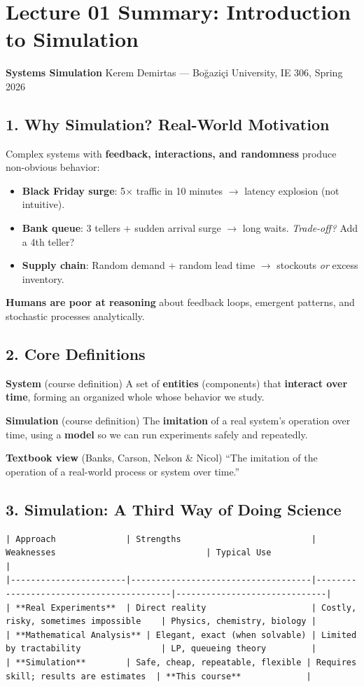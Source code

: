 \documentclass[11pt]{article}
\begin{document}
\section*{Lecture 01 Summary: Introduction to Simulation}
\textbf{Systems Simulation}
Kerem Demirtas --- Boğaziçi University, IE 306, Spring 2026

\subsection*{1. Why Simulation? Real-World Motivation}
Complex systems with \textbf{feedback, interactions, and randomness} produce non-obvious behavior:

\begin{itemize}[leftmargin=*]
\item \textbf{Black Friday surge}: 5$\times$ traffic in 10 minutes $\rightarrow$ latency explosion (not intuitive).
\item \textbf{Bank queue}: 3 tellers + sudden arrival surge $\rightarrow$ long waits. \textit{Trade-off?} Add a 4th teller?
\item \textbf{Supply chain}: Random demand + random lead time $\rightarrow$ stockouts \textit{or} excess inventory.
\end{itemize}

\textbf{Humans are poor at reasoning} about feedback loops, emergent patterns, and stochastic processes analytically.

\subsection*{2. Core Definitions}
\textbf{System} (course definition)  
A set of \textbf{entities} (components) that \textbf{interact over time}, forming an organized whole whose behavior we study.

\textbf{Simulation} (course definition)  
The \textbf{imitation} of a real system's operation over time, using a \textbf{model} so we can run experiments safely and repeatedly.

\textbf{Textbook view} (Banks, Carson, Nelson \& Nicol)  
``The imitation of the operation of a real-world process or system over time.''

\subsection*{3. Simulation: A Third Way of Doing Science}
\begin{verbatim}
| Approach              | Strengths                          | Weaknesses                              | Typical Use                  |
|-----------------------|------------------------------------|-----------------------------------------|------------------------------|
| **Real Experiments**  | Direct reality                     | Costly, risky, sometimes impossible    | Physics, chemistry, biology |
| **Mathematical Analysis** | Elegant, exact (when solvable) | Limited by tractability                | LP, queueing theory         |
| **Simulation**        | Safe, cheap, repeatable, flexible | Requires skill; results are estimates  | **This course**             |
\end{verbatim}
\end{document}
